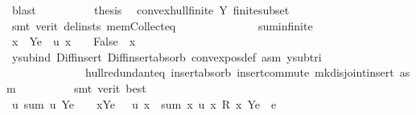 \begin{isabellebody}
\ blast\isanewline
\ \ \ \ \ \ \ \ \isamarkupfalse%
\ {\isacharquery}{\kern0pt}thesis\ \isamarkupfalse%
\ convex{\isacharunderscore}{\kern0pt}hull{\isacharunderscore}{\kern0pt}finite\ Y{\isacharparenleft}{\kern0pt}{}{\isacharparenright}{\kern0pt}\ finite{\isacharunderscore}{\kern0pt}subset\isanewline
\ \ \ \ \ \ \ \ \ \ \isamarkupfalse%
\ {\isacharparenleft}{\kern0pt}smt\ {\isacharparenleft}{\kern0pt}verit{\isacharcomma}{\kern0pt}\ del{\isacharunderscore}{\kern0pt}insts{\isacharparenright}{\kern0pt}\ mem{\isacharunderscore}{\kern0pt}Collect{\isacharunderscore}{\kern0pt}eq\isanewline
\ \ \ \ \ \ \ \ \ \ \ \ \ \ sum{\isachardot}{\kern0pt}infinite{\isacharparenright}{\kern0pt}\isanewline
\ \ \ \ \ \ \isamarkupfalse%
\isanewline
\isanewline
\ \ \ \ \ \ \isamarkupfalse%
\ {\isachardoublequoteopen}x\ {\isasymin}\ {\isacharparenleft}{\kern0pt}Y{\isacharminus}{\kern0pt}{\isacharbraceleft}{\kern0pt}e{\isacharbraceright}{\kern0pt}{\isacharparenright}{\kern0pt}\ {\isasymand}\ u\ x\ {\isacharequal}{\kern0pt}\ {}\ {\isasymLongrightarrow}\ False{\isachardoublequoteclose}\ \ x\isanewline
\ \ \ \ \ \ \ \ \isamarkupfalse%
\ y{\isacharunderscore}{\kern0pt}sub{\isacharunderscore}{\kern0pt}ind\ Diff{\isacharunderscore}{\kern0pt}insert{}\ Diff{\isacharunderscore}{\kern0pt}insert{\isacharunderscore}{\kern0pt}absorb\ convex{\isacharunderscore}{\kern0pt}pos{\isacharunderscore}{\kern0pt}def\ asm\ y{\isacharunderscore}{\kern0pt}sub{\isacharunderscore}{\kern0pt}tri\isanewline
\ \ \ \ \ \ \ \ \ \ \ \ \ \ hull{\isacharunderscore}{\kern0pt}redundant{\isacharunderscore}{\kern0pt}eq\ insert{\isacharunderscore}{\kern0pt}absorb\ insert{\isacharunderscore}{\kern0pt}commute\ mk{\isacharunderscore}{\kern0pt}disjoint{\isacharunderscore}{\kern0pt}insert\ asm\isanewline
\ \ \ \ \ \ \ \ \isamarkupfalse%
\ {\isacharparenleft}{\kern0pt}smt\ {\isacharparenleft}{\kern0pt}verit{\isacharcomma}{\kern0pt}\ best{\isacharparenright}{\kern0pt}{\isacharparenright}{\kern0pt}\isanewline
\isanewline
\ \ \ \ \ \ \isamarkupfalse%
\ {\isachardoublequoteopen}{\isacharparenleft}{\kern0pt}{\isasymexists}u{\isachardot}{\kern0pt}\ {\isacharparenleft}{\kern0pt}sum\ u\ {\isacharparenleft}{\kern0pt}Y{\isacharminus}{\kern0pt}{\isacharbraceleft}{\kern0pt}e{\isacharbraceright}{\kern0pt}{\isacharparenright}{\kern0pt}\ {\isacharequal}{\kern0pt}\ {}{\isacharparenright}{\kern0pt}\ {\isasymand}\ {\isacharparenleft}{\kern0pt}{\isasymforall}x{\isasymin}{\isacharparenleft}{\kern0pt}Y{\isacharminus}{\kern0pt}{\isacharbraceleft}{\kern0pt}e{\isacharbraceright}{\kern0pt}{\isacharparenright}{\kern0pt}{\isachardot}{\kern0pt}\ {}\ {\isacharless}{\kern0pt}\ u\ x{\isacharparenright}{\kern0pt}\ {\isasymand}\ sum\ {\isacharparenleft}{\kern0pt}{\isasymlambda}x{\isachardot}{\kern0pt}\ u\ x\ {\isacharasterisk}{\kern0pt}\isactrlsub R\ x{\isacharparenright}{\kern0pt}\ {\isacharparenleft}{\kern0pt}Y{\isacharminus}{\kern0pt}{\isacharbraceleft}{\kern0pt}e{\isacharbraceright}{\kern0pt}{\isacharparenright}{\kern0pt}\ {\isacharequal}{\kern0pt}\ e{\isacharparenright}{\kern0pt}{\isachardoublequoteclose}\isanewline

\end{isabellebody}
